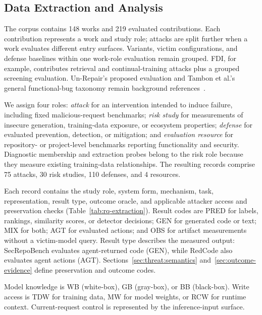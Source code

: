\documentclass[acmsmall,screen,review,nonacm]{acmart}
\begin{document}
\subsection{Data Extraction and Analysis}
\label{sec:corpus}

The corpus contains 148 works and 219 evaluated contributions. Each contribution represents a work and study role; attacks are split further when a work evaluates different entry surfaces. Variants, victim configurations, and defense baselines within one work-role evaluation remain grouped. FDI, for example, contributes retrieval and continual-training attacks plus a grouped screening evaluation. Un-Repair's proposed evaluation and Tambon et al.'s general functional-bug taxonomy remain background references~\cite{unrepairing2024,tambon2025bugs}.

We assign four roles: \emph{attack} for an intervention intended to induce failure, including fixed malicious-request benchmarks; \emph{risk study} for measurements of insecure generation, training-data exposure, or ecosystem properties; \emph{defense} for evaluated prevention, detection, or mitigation; and \emph{evaluation resource} for repository- or project-level benchmarks reporting functionality and security. Diagnostic membership and extraction probes belong to the risk role because they measure existing training-data relationships. The resulting records comprise 75 attacks, 30 risk studies, 110 defenses, and 4 resources.

\label{sec:coding}
Each record contains the study role, system form, mechanism, task, representation, result type, outcome oracle, and applicable attacker access and preservation checks (Table~\ref{tab:rq-extraction}). Result codes are \textsf{PRED} for labels, rankings, similarity scores, or detector decisions; \textsf{GEN} for generated code or text; \textsf{MIX} for both; \textsf{AGT} for evaluated actions; and \textsf{OBS} for artifact measurements without a victim-model query. Result type describes the measured output: SecRepoBench evaluates agent-returned code (\textsf{GEN}), while RedCode also evaluates agent actions (\textsf{AGT}). Sections~\ref{sec:threat:semantics} and~\ref{sec:outcome-evidence} define preservation and outcome codes.

Model knowledge is \textsf{WB} (white-box), \textsf{GB} (gray-box), or \textsf{BB} (black-box). Write access is \textsf{TDW} for training data, \textsf{MW} for model weights, or \textsf{RCW} for runtime context. Current-request control is represented by the inference-input surface.
\end{document}
